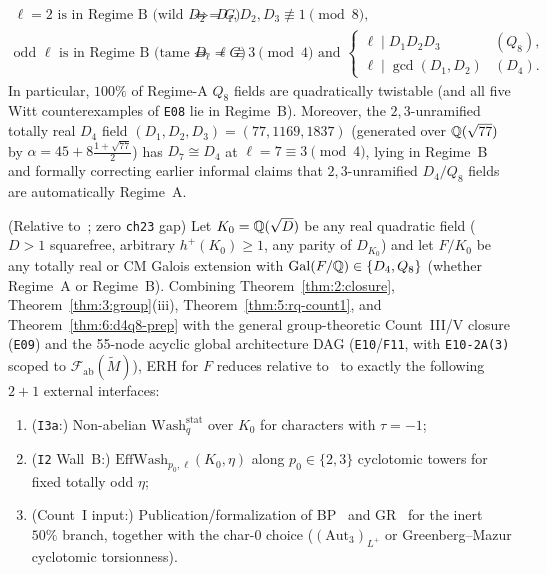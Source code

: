 \begin{theorem}
\begin{enumerate}[label=\textup{(\roman*)}]
\begin{align*}
  \ell = 2 \text{ is in Regime~B (wild } D_2 = G\text{)} &\;\Longleftrightarrow\; D_1, D_2, D_3 \not\equiv 1 \pmod 8,\\
  \text{odd } \ell \text{ is in Regime~B (tame } D_\ell = G\text{)} &\;\Longleftrightarrow\; \ell \equiv 3 \pmod 4 \text{ and } \begin{cases} \ell \mid D_1 D_2 D_3 & (Q_8), \\ \ell \mid \gcd(D_1, D_2) & (D_4). \end{cases}
\end{align*}
In particular, $100\%$ of Regime-A $Q_8$ fields are quadratically twistable (and all five Witt counterexamples of \texttt{E08} lie in Regime~B). Moreover, the $2,3$-unramified totally real $D_4$ field $(D_1, D_2, D_3) = (77, 1169, 1837)$ (generated over $\mathbb{Q}(\sqrt{77})$ by $\alpha = 45 + 8\frac{1+\sqrt{77}}{2}$) has $D_7 \cong D_4$ at $\ell = 7 \equiv 3 \pmod 4$, lying in Regime~B and formally correcting earlier informal claims that $2,3$-unramified $D_4/Q_8$ fields are automatically Regime~A.
\end{enumerate}
\end{theorem}

\begin{theorem}\label{thm:6:ud4q8}
\tagCond{} \textup{(Relative to~\cite{Alpoge2026}; zero \texttt{ch23} gap)}
Let $K_0 = \mathbb{Q}(\sqrt{D})$ be any real quadratic field ($D > 1$ squarefree, arbitrary $h^+(K_0) \ge 1$, any parity of $D_{K_0}$) and let $F/K_0$ be any totally real or CM Galois extension with $\mathrm{Gal}(F/\mathbb{Q}) \in \{D_4, Q_8\}$ (whether Regime~A or Regime~B). Combining Theorem~\ref{thm:2:closure}, Theorem~\ref{thm:3:group}(iii), Theorem~\ref{thm:5:rq-count1}, and Theorem~\ref{thm:6:d4q8-prep} with the general group-theoretic Count~III/V closure (\texttt{E09}) and the 55-node acyclic global architecture DAG (\texttt{E10}/\texttt{F11}, with \texttt{E10-2A(3)} scoped to $\mathcal{F}_{\mathrm{ab}}(\widetilde{M})$), ERH for $F$ reduces relative to~\cite{Alpoge2026} to exactly the following $2+1$ external interfaces:
\begin{enumerate}[label=\textbf{(IF-\arabic*)}]
\item \textup{(\texttt{I3a}:)} Non-abelian $\mathrm{Wash}_q^{\mathrm{stat}}$ over $K_0$ for characters with $\tau = -1$;
\item \textup{(\texttt{I2} Wall~B:)} $\mathrm{EffWash}_{p_0, \ell}(K_0, \eta)$ along $p_0 \in \{2,3\}$ cyclotomic towers for fixed totally odd $\eta$;
\item \textup{(Count~I input:)} Publication/formalization of BP~\cite{BP2021} and GR~\cite{GR2024} for the inert $50\%$ branch, together with the char-$0$ choice ($(\mathrm{Aut}_3)_{L^+}$ or Greenberg--Mazur cyclotomic torsionness).
\end{enumerate}
\end{theorem}

